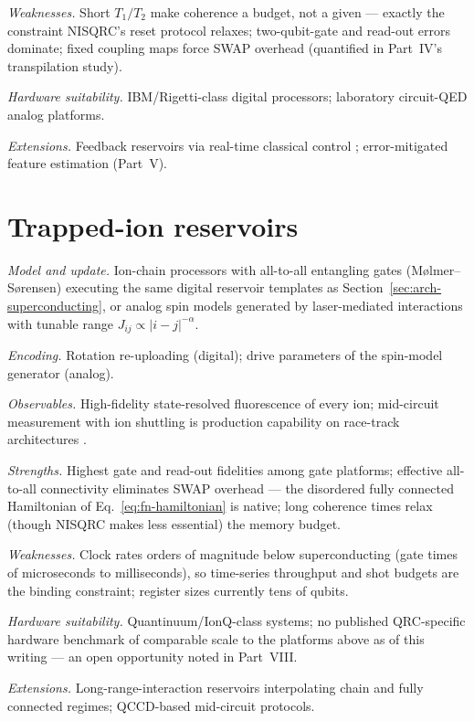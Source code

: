 \emph{Weaknesses.} Short $T_1/T_2$ make coherence a budget, not a given ---
exactly the constraint NISQRC's reset protocol relaxes; two-qubit-gate and
read-out errors dominate; fixed coupling maps force SWAP overhead
(quantified in Part~IV's transpilation study).

\emph{Hardware suitability.} IBM/Rigetti-class digital processors; laboratory
circuit-QED analog platforms.

\emph{Extensions.} Feedback reservoirs via real-time classical control
\citep{kobayashi2024feedback}; error-mitigated feature estimation (Part~V).

\section{Trapped-ion reservoirs}
\label{sec:arch-ion}

\emph{Model and update.} Ion-chain processors with all-to-all entangling
gates (M{\o}lmer--S{\o}rensen) executing the same digital reservoir templates
as Section~\ref{sec:arch-superconducting}, or analog spin models generated by
laser-mediated interactions with tunable range
$J_{ij}\propto |i-j|^{-\alpha}$.

\emph{Encoding.} Rotation re-uploading (digital); drive parameters of the
spin-model generator (analog).

\emph{Observables.} High-fidelity state-resolved fluorescence of every ion;
mid-circuit measurement with ion shuttling is production capability on
race-track architectures \citep{moses2023race}.

\emph{Strengths.} Highest gate and read-out fidelities among gate platforms;
effective all-to-all connectivity eliminates SWAP overhead --- the disordered
fully connected Hamiltonian of Eq.~\eqref{eq:fn-hamiltonian} is native;
long coherence times relax (though NISQRC makes less essential) the memory
budget.

\emph{Weaknesses.} Clock rates orders of magnitude below superconducting
(gate times of microseconds to milliseconds), so time-series
throughput and shot budgets are the binding constraint; register sizes
currently tens of qubits.

\emph{Hardware suitability.} Quantinuum/IonQ-class systems; no published
QRC-specific hardware benchmark of comparable scale to the platforms above as
of this writing --- an open opportunity noted in Part~VIII.

\emph{Extensions.} Long-range-interaction reservoirs interpolating chain and
fully connected regimes; QCCD-based mid-circuit protocols.

